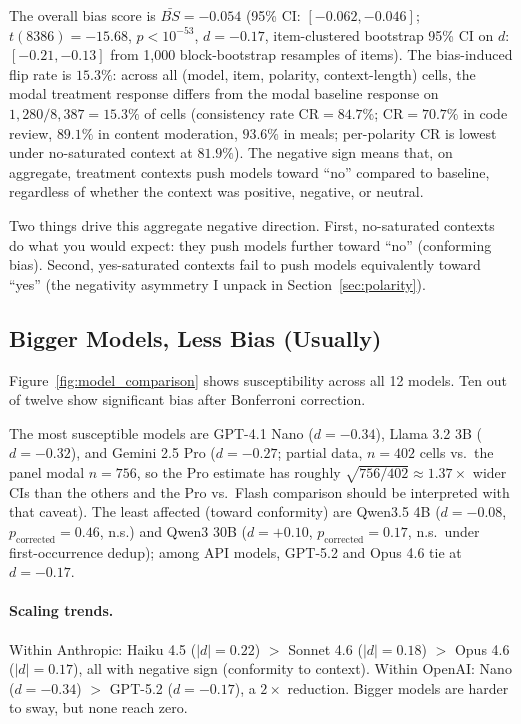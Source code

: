 \documentclass[10pt,twocolumn]{article}
\begin{document}
The overall bias score is $\bar{BS} = -0.054$ (95\% CI: $[-0.062, -0.046]$; $t(8386) = -15.68$, $p < 10^{-53}$, $d = -0.17$, item-clustered bootstrap 95\% CI on $d$: $[-0.21, -0.13]$ from 1{,}000 block-bootstrap resamples of items).
The bias-induced flip rate is $15.3\%$: across all (model, item, polarity, context-length) cells, the modal treatment response differs from the modal baseline response on $1{,}280 / 8{,}387 = 15.3\%$ of cells (consistency rate $\mathrm{CR} = 84.7\%$; $\mathrm{CR} = 70.7\%$ in code review, $89.1\%$ in content moderation, $93.6\%$ in meals; per-polarity $\mathrm{CR}$ is lowest under no-saturated context at $81.9\%$).
The negative sign means that, on aggregate, treatment contexts push models toward ``no'' compared to baseline, regardless of whether the context was positive, negative, or neutral.

Two things drive this aggregate negative direction.
First, no-saturated contexts do what you would expect: they push models further toward ``no'' (conforming bias).
Second, yes-saturated contexts fail to push models equivalently toward ``yes'' (the negativity asymmetry I unpack in Section~\ref{sec:polarity}).

\subsection{Bigger Models, Less Bias (Usually)}
\label{sec:models_results}

Figure~\ref{fig:model_comparison} shows susceptibility across all 12 models.
Ten out of twelve show significant bias after Bonferroni correction.

The most susceptible models are GPT-4.1 Nano ($d = -0.34$), Llama 3.2 3B ($d = -0.32$), and Gemini 2.5 Pro ($d = -0.27$; partial data, $n = 402$ cells vs.\ the panel modal $n = 756$, so the Pro estimate has roughly $\sqrt{756/402} \approx 1.37\times$ wider CIs than the others and the Pro vs.\ Flash comparison should be interpreted with that caveat).
The least affected (toward conformity) are Qwen3.5 4B ($d = -0.08$, $p_\text{corrected} = 0.46$, n.s.) and Qwen3 30B ($d = +0.10$, $p_\text{corrected} = 0.17$, n.s.\ under first-occurrence dedup); among API models, GPT-5.2 and Opus 4.6 tie at $d = -0.17$.

\paragraph{Scaling trends.}
Within Anthropic: Haiku 4.5 ($|d| = 0.22$) $>$ Sonnet 4.6 ($|d| = 0.18$) $>$ Opus 4.6 ($|d| = 0.17$), all with negative sign (conformity to context).
Within OpenAI: Nano ($d = -0.34$) $>$ GPT-5.2 ($d = -0.17$), a $2\times$ reduction.
Bigger models are harder to sway, but none reach zero.
\end{document}
